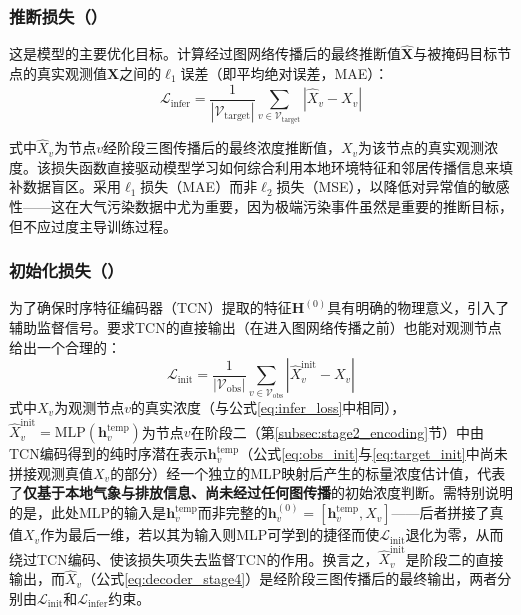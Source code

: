 \subsubsection[推断损失（\texorpdfstring{\LossInfer}{L\_infer}）]{推断损失（\LossInfer）}

这是模型的主要优化目标。计算经过图网络传播后的最终推断值$\hat{\mathbf{X}}$与被掩码目标节点的真实观测值$\mathbf{X}$之间的$\ell_1$误差（即平均绝对误差，MAE）：
\begin{equation}
    \mathcal{L}_{\mathrm{infer}} = \frac{1}{|\mathcal{V}_{\text{target}}|} \sum_{v \in \mathcal{V}_{\text{target}}} |\hat{X}_v - X_v|
\label{eq:infer_loss}
\end{equation}

\noindent 式中$\hat{X}_v$为节点$v$经阶段三图传播后的最终浓度推断值，$X_v$为该节点的真实观测浓度。该损失函数直接驱动模型学习如何综合利用本地环境特征和邻居传播信息来填补数据盲区。采用$\ell_1$损失（MAE）而非$\ell_2$损失（MSE），以降低对异常值的敏感性——这在大气污染数据中尤为重要，因为极端污染事件虽然是重要的推断目标，但不应过度主导训练过程。


\subsubsection[初始化损失（\texorpdfstring{\LossInit}{L\_init}）]{初始化损失（\LossInit）}

为了确保时序特征编码器（TCN）提取的特征$\mathbf{H}^{(0)}$具有明确的物理意义，引入了辅助监督信号。要求TCN的直接输出（在进入图网络传播之前）也能对观测节点给出一个合理的：
\begin{equation}
    \mathcal{L}_{\mathrm{init}} = \frac{1}{|\mathcal{V}_{\text{obs}}|} \sum_{v \in \mathcal{V}_{\text{obs}}} |\hat{X}_v^{\text{init}} - X_v|
\label{eq:init_loss}
\end{equation}
\noindent 式中$X_v$为观测节点$v$的真实\PM 浓度（与公式\eqref{eq:infer_loss}中相同），$\hat{X}_v^{\text{init}} = \text{MLP}(\mathbf{h}_v^{\text{temp}})$为节点$v$在阶段二（第\ref{subsec:stage2_encoding}节）中由TCN编码得到的纯时序潜在表示$\mathbf{h}_v^{\text{temp}}$（公式\eqref{eq:obs_init}与\eqref{eq:target_init}中尚未拼接观测真值$X_v$的部分）经一个独立的MLP映射后产生的标量浓度估计值，代表了\textbf{仅基于本地气象与排放信息、尚未经过任何图传播}的初始浓度判断。需特别说明的是，此处MLP的输入是$\mathbf{h}_v^{\text{temp}}$而非完整的$\mathbf{h}_v^{(0)}=[\mathbf{h}_v^{\text{temp}}, X_v]$——后者拼接了真值$X_v$作为最后一维，若以其为输入则MLP可学到的捷径而使$\mathcal{L}_{\mathrm{init}}$退化为零，从而绕过TCN编码、使该损失项失去监督TCN的作用。换言之，$\hat{X}_v^{\text{init}}$是阶段二的直接输出，而$\hat{X}_v$（公式\eqref{eq:decoder_stage4}）是经阶段三图传播后的最终输出，两者分别由$\mathcal{L}_{\mathrm{init}}$和$\mathcal{L}_{\mathrm{infer}}$约束。


